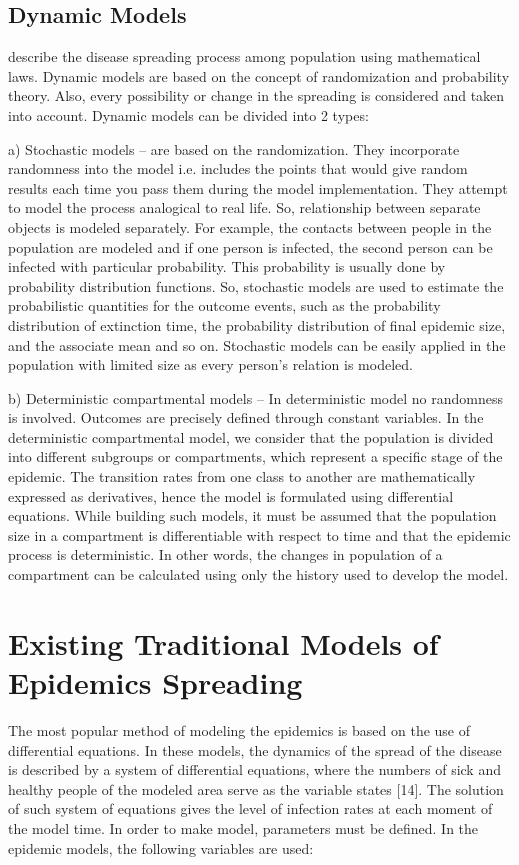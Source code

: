 \subsection{Dynamic Models}
describe the disease spreading process among population using mathematical laws. Dynamic models are based on the concept of randomization and probability theory. Also, every possibility or change in the spreading is considered and taken into account. Dynamic models can be divided into 2 types:

a) Stochastic models – are based on the randomization. They incorporate randomness into the model i.e. includes the points that would give random results each time you pass them during the model implementation. They attempt to model the process analogical to real life. So, relationship between separate objects is modeled separately. For example, the contacts between people in the population are modeled and if one person is infected, the second person can be infected with particular probability. This probability is usually done by probability distribution functions. So, stochastic models are used to estimate the probabilistic quantities for the outcome events, such as the probability distribution of extinction time, the probability distribution of final epidemic size, and the associate mean and so on. Stochastic models can be easily applied in the population with limited size as every person’s relation is modeled.

b) Deterministic compartmental models – In deterministic model no randomness is involved. Outcomes are precisely defined through constant variables. In the deterministic compartmental model, we consider that the population is divided into different subgroups or compartments, which represent a specific stage of the epidemic. The transition rates from one class to another are mathematically expressed as derivatives, hence the model is formulated using differential equations. While building such models, it must be assumed that the population size in a compartment is differentiable with respect to time and that the epidemic process is deterministic. In other words, the changes in population of a compartment can be calculated using only the history used to develop the model.

\section{Existing Traditional Models of Epidemics Spreading}

The most popular method of modeling the epidemics is based on the use of differential equations. In these models, the dynamics of the spread of the disease is described by a system of differential equations, where the numbers of sick and healthy people of the modeled area serve as the variable states [14]. The solution of such system of equations gives the level of infection rates at each moment of the model time. In order to make model, parameters must be defined. In the epidemic models, the following variables are used:

